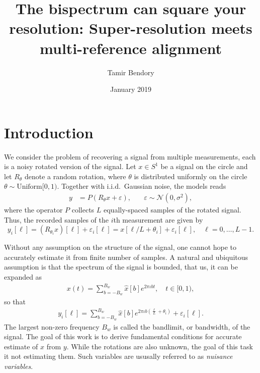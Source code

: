 \documentclass[english,12pt]{article}
\newcommand{\I}{\iota}
\newcommand{\tB}{B_w}
\numberwithin{equation}{section}
\numberwithin{thm}{section} %
\begin{document}
\title{The bispectrum can square your resolution: Super-resolution meets multi-reference alignment}

\author{Tamir Bendory}
\date{January 2019}
\maketitle


\section{Introduction}

We consider the problem of recovering a signal from multiple measurements, each is a noisy rotated  version of the signal. Let $x\in S^1$ be a signal on the circle and  let $R_\theta$ denote a random rotation, where $\theta$ is distributed uniformly on the circle $\theta\sim \text{Uniform}[0,1)$. Together with i.i.d.\ Gaussian noise,  the models reads
\begin{align} \label{eq:model}
y &= P(R_\theta x + \varepsilon), \quad &\varepsilon\sim \mathcal{N}(0,\sigma^2),
\end{align}
where the operator $P$ collects $L$ equally-spaced samples of the rotated signal. Thus, the recorded samples of the $i$th measurement are given by 
\begin{equation} \label{eq:continuous_measurements}
y_i[\ell] = \left(R_{\theta_i} x\right)[\ell] + \varepsilon_i[\ell] =  x[\ell/L+\theta_i] + \varepsilon_i[\ell], \quad \ell=0,\ldots,L-1.
\end{equation}


Without any assumption on the structure of the signal, one cannot hope to accurately estimate it from finite number of samples. 
A natural and ubiquitous assumption is that
the spectrum of the signal is bounded, that us,  it can  be expanded as 
\begin{eqnarray} \label{eq:fourier_expansion}
x(t) = \sum_{b=-\tB}^{\tB}\hat{x}[b]e^{2\pi\I bt }, \quad t\in[0,1),
\end{eqnarray}
so that
\begin{eqnarray} \label{eq:fourier_expansion}
y_i[\ell] = \sum_{b=-\tB}^{\tB}\hat{x}[b]e^{2\pi\I b\left(\frac{\ell}{L}+\theta_i\right) }+ \varepsilon_i[\ell].
\end{eqnarray}
The largest non-zero frequency $\tB$ is called the bandlimit, or bandwidth, of the signal.
The goal of this work is to derive  fundamental conditions for accurate estimate of $x$ from $y$. While the rotations are also unknown, the goal of this task it not estimating them. Such variables are ususally referred to as \emph{nuisance variables}.
\end{document}

